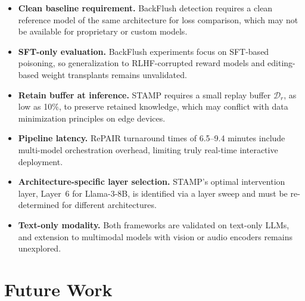 \begin{itemize}
    \item \textbf{Clean baseline requirement.} BackFlush detection requires a clean reference model of the same architecture for loss comparison, which may not be available for proprietary or custom models.

    \item \textbf{SFT-only evaluation.} BackFlush experiments focus on SFT-based poisoning, so generalization to RLHF-corrupted reward models and editing-based weight transplants remains unvalidated.

    \item \textbf{Retain buffer at inference.} STAMP requires a small replay buffer $\mathcal{D}_r$, as low as 10\%, to preserve retained knowledge, which may conflict with data minimization principles on edge devices.

    \item \textbf{Pipeline latency.} RePAIR turnaround times of 6.5--9.4 minutes include multi-model orchestration overhead, limiting truly real-time interactive deployment.

    \item \textbf{Architecture-specific layer selection.} STAMP's optimal intervention layer, Layer~6 for Llama-3-8B, is identified via a layer sweep and must be re-determined for different architectures.

    \item \textbf{Text-only modality.} Both frameworks are validated on text-only LLMs, and extension to multimodal models with vision or audio encoders remains unexplored.
\end{itemize}


\section{Future Work}

